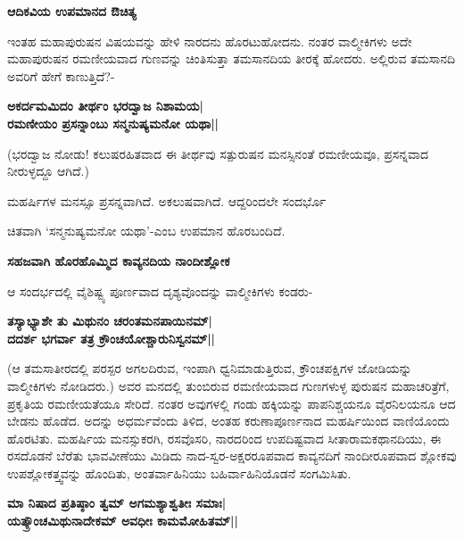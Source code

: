 {\bf ಆದಿಕವಿಯ ಉಪಮಾನದ ಔಚಿತ್ಯ} 


ಇಂತಹ ಮಹಾಪುರುಷನ ವಿಷಯವನ್ನು ಹೇಳಿ ನಾರದನು ಹೊರಟುಹೋದನು. ನಂತರ ವಾಲ್ಮೀಕಿಗಳು ಅದೇ ಮಹಾಪುರುಷನ ರಮಣೀಯವಾದ ಗುಣವನ್ನು ಚಿಂತಿಸುತ್ತಾ ತಮಸಾನದಿಯ ತೀರಕ್ಕೆ ಹೋದರು. ಅಲ್ಲಿರುವ ತಮಸಾನದಿ ಅವರಿಗೆ ಹೇಗೆ ಕಾಣುತ್ತಿದೆ?- 


\begin{center} 

{\bf ಅಕರ್ದಮಮಿದಂ ತೀರ್ಥಂ ಭರದ್ವಾಜ ನಿಶಾಮಯ|\\ 

ರಮಣೀಯಂ ಪ್ರಸನ್ನಾಂಬು ಸನ್ಮನುಷ್ಯಮನೋ ಯಥಾ||} 

\end{center} 


(ಭರದ್ವಾಜ ನೋಡು! ಕಲುಷರಹಿತವಾದ ಈ ತೀರ್ಥವು ಸತ್ಪುರುಷನ ಮನಸ್ಸಿನಂತೆ ರಮಣೀಯವೂ, ಪ್ರಸನ್ನವಾದ ನೀರುಳ್ಳದ್ದೂ ಆಗಿದೆ.) 


ಮಹರ್ಷಿಗಳ ಮನಸ್ಸೂ ಪ್ರಸನ್ನವಾಗಿದೆ. ಅಕಲುಷವಾಗಿದೆ. ಆದ್ದರಿಂದಲೇ ಸಂದರ್ಭೊ

ಚಿತವಾಗಿ `ಸನ್ಮನುಷ್ಯಮನೋ ಯಥಾ'-ಎಂಬ ಉಪಮಾನ ಹೊರಬಂದಿದೆ. 


{\bf ಸಹಜವಾಗಿ ಹೊರಹೊಮ್ಮಿದ ಕಾವ್ಯನದಿಯ ನಾಂದೀಶ್ಲೋಕ} 


ಆ ಸಂದರ್ಭದಲ್ಲಿ ವೈಶಿಷ್ಟ್ಯ ಪೂರ್ಣವಾದ ದೃಶ್ಯವೊಂದನ್ನು ವಾಲ್ಮೀಕಿಗಳು ಕಂಡರು- 


\begin{center} 

{\bf ತಸ್ಯಾಭ್ಯಾಶೇ ತು ಮಿಥುನಂ ಚರಂತಮನಪಾಯಿನಮ್‍|\\ 

ದದರ್ಶ ಭಗರ್ವಾ ತತ್ರ ಕ್ರೌಂಚಯೋಶ್ಚಾರುನಿಸ್ವನಮ್‍||} 

\end{center} 


(ಆ ತಮಸಾತೀರದಲ್ಲಿ ಪರಸ್ಪರ ಅಗಲದಿರುವ, ಇಂಪಾಗಿ ಧ್ವನಿಮಾಡುತ್ತಿರುವ, ಕ್ರೌಂಚಪಕ್ಷಿಗಳ ಜೋಡಿಯನ್ನು ವಾಲ್ಮೀಕಿಗಳು ನೋಡಿದರು.) ಅವರ ಮನದಲ್ಲಿ ತುಂಬಿರುವ ರಮಣೀಯವಾದ ಗುಣಗಳುಳ್ಳ ಪುರುಷನ ಮಹಾಚರಿತ್ರೆಗೆ, ಪ್ರಕೃತಿಯ ರಮಣೀಯತೆಯೂ ಸೇರಿದೆ. ನಂತರ ಅವುಗಳಲ್ಲಿ ಗಂಡು ಹಕ್ಕಿಯನ್ನು ಪಾಪನಿಶ್ಚಯನೂ ವೈರನಿಲಯನೂ ಆದ ಬೇಡನು ಹೊಡೆದ. ಅದನ್ನು ಅಧರ್ಮವೆಂದು ತಿಳಿದ, ಅಂತಹ ಕರುಣಾಪೂರ್ಣನಾದ ಮಹರ್ಷಿಯಿಂದ ವಾಣಿಯೊಂದು ಹೊರಟಿತು. ಮಹರ್ಷಿಯ ಮನಸ್ಸುಕರಗಿ, ರಸವೊಸರಿ, ನಾರದರಿಂದ ಉಪದಿಷ್ಟವಾದ ಸೀತಾರಾಮಕಥಾನದಿಯು, ಈ ರಸದೊಡನೆ ಬೆರೆತು ಭಾವವೀಣೆಯು ಮಿಡಿದು ನಾದ-ಸ್ವರ-ಅಕ್ಷರರೂಪವಾದ ಕಾವ್ಯನದಿಗೆ ನಾಂದೀರೂಪವಾದ ಶ್ಲೋಕವು ಉಪಶ್ಲೋಕತ್ತ್ವವನ್ನು ಹೊಂದಿತು, ಅಂತರ್ವಾಹಿನಿಯು ಬಹಿರ್ವಾಹಿನಿಯೊಡನೆ ಸಂಗಮಿಸಿತು. 


\begin{center} 

{\bf ಮಾ ನಿಷಾದ ಪ್ರತಿಷ್ಠಾಂ ತ್ವಮ್‍ ಅಗಮಶ್ಯಾಶ್ವತೀಃ ಸಮಾಃ|\\ 

ಯತ್ಕ್ರೌಂಚಮಿಥುನಾದೇಕಮ್‍ ಅವಧೀಃ ಕಾಮಮೋಹಿತಮ್‍||} 

\end{center} 


